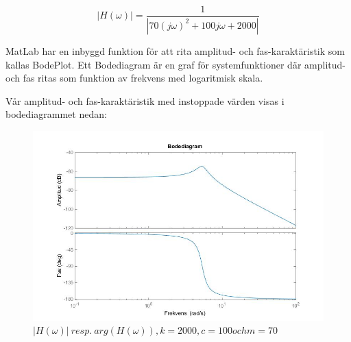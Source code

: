 \documentclass[10pt,a4paper]{article}
\begin{document}
\begin{equation}
|H(\omega)| = \frac{1}{|70 (j\omega)^2 + 100  j\omega + 2000|}
\end{equation}

MatLab har en inbyggd funktion för att rita amplitud- och fas-karaktäristik som kallas BodePlot. Ett Bodediagram är en graf för systemfunktioner där amplitud- och fas ritas som funktion av frekvens med logaritmisk skala.

Vår amplitud- och fas-karaktäristik med instoppade värden visas i bodediagrammet nedan:


\begin{figure}[h]
\begin{center}
\includegraphics[scale=0.5]{BodePlot(FasAmpKar)}
\caption{$|H(\omega)| \ resp. \ arg(H(\omega)), k = 2000, c = 100 och m = 70$ }
\end{center}
\end{figure}

\newpage
\end{document}
